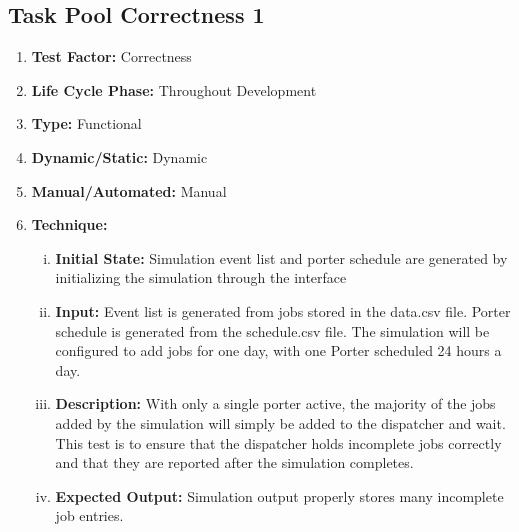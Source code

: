 \documentclass[paper=letter, fontsize=10pt]{scrartcl}
\numberwithin{equation}{section}		%
\numberwithin{figure}{section}			%
\numberwithin{table}{section}				%
\begin{document}
\subsection{Task Pool Correctness 1}
\begin{enumerate}[]
	\item \textbf{Test Factor:} Correctness
	\item \textbf{Life Cycle Phase:} Throughout Development
	\item \textbf{Type:} Functional
	\item \textbf{Dynamic/Static:} Dynamic
	\item \textbf{Manual/Automated:} Manual
	\item \textbf{Technique:}
		\begin{enumerate}[(i)]
			\item \textbf{Initial State:} Simulation event list and porter schedule are generated by initializing the simulation through the interface
			\item \textbf{Input:} Event list is generated from jobs stored in the data.csv file. Porter schedule is generated from the schedule.csv file. The simulation will be configured to add jobs for one day, with one Porter scheduled 24 hours a day.
			\item \textbf{Description:} With only a single porter active, the majority of the jobs added by the simulation will simply be added to the dispatcher and wait. This test is to ensure that the dispatcher holds incomplete jobs correctly and that they are reported after the simulation completes.
			\item \textbf{Expected Output:} Simulation output properly stores many incomplete job entries. 
		\end{enumerate}
\end{enumerate}
\end{document}
